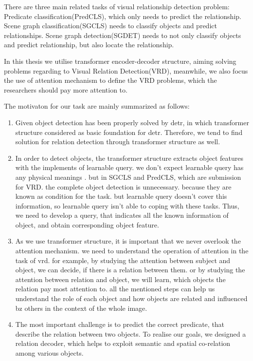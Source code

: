 There are three main related tasks of visual relationship detection problem: Predicate classification(PredCLS), which only needs to predict the relationship. Scene graph classification(SGCLS) needs to classify objects and  predict relationships. Scene graph detection(SGDET) needs to not only classify objects and  predict relationship, but also locate  the relationship.

In this thesis we utilise transformer encoder-decoder structure, aiming solving problems regarding to Visual Relation Detection(VRD), meanwhile, we also focus the use of attention mechanism to define the VRD problems, which the researchers should pay more attention to.

The motivaton for our task are mainly summarized as follows:

\begin{enumerate}[\qquad 1.]
	\item Given object detection has been properly solved by detr, in which transformer structure considered as basic foundation for detr. Therefore, we tend to find solution for relation detection through transformer structure as well.
	\item In order to detect objects, the transformer structure extracts object features with the implements of learnable query. we don't expect learnable query has any physical meanings . but in SGCLS and PredCLS, which are submission for VRD. the complete object detection is unnecessary. because they are known as condition for the task. but learnable query doesn't cover this information, so learnable query isn't able to coping with these tasks. Thus, we need to develop a query, that indicates all the known information of object, and obtain corresponding object feature.
	\item As we use transformer structure, it is important that we never overlook the attention mechanism. we need to understand the operation of  attention in the task of vrd. for example, by studying the attention between subject and object, we can decide, if there is a relation between them. or by studying the attention between relation and object, we will learn, which objects the relation pay most attention to. all the mentioned steps can help us understand the role of each object and how objects are related and influenced bz others in the context of the whole image.
	\item The most important challenge is to predict the correct predicate, that describe the relation between two objects. To realise our goals, we designed a relation decoder, which helps to exploit semantic and spatial co-relation among various objects.
\end{enumerate}
 


